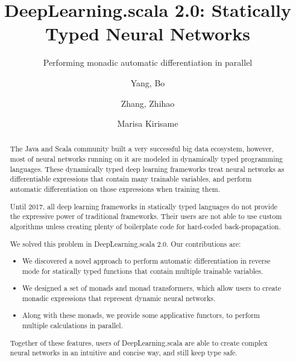 \documentclass[acmsmall,10pt,review,screen,anonymous]{acmart}
\begin{document}
\title{DeepLearning.scala 2.0: Statically Typed Neural Networks}
\subtitle{Performing monadic automatic differentiation in parallel}

\author{Yang, Bo}
\author{Zhang, Zhihao}
\author{Marisa Kirisame} 

\begin{abstract}
The Java and Scala community built a very successful big data ecosystem, however, most of neural networks running on it are modeled in dynamically typed programming languages. These dynamically typed deep learning frameworks treat neural networks as differentiable expressions that contain many \glspl{trainable variable}, and perform automatic differentiation on those expressions when training them.

Until 2017, all deep learning frameworks in statically typed languages do not
provide the expressive power of traditional frameworks. Their users are not able to use custom algorithms unless creating plenty of boilerplate code for hard-coded back-propagation.

We solved this problem in DeepLearning.scala 2.0. Our contributions are:

\begin{itemize}
  \item We discovered a novel approach to perform automatic differentiation in reverse mode for statically typed functions that contain multiple \glspl{trainable variable}.
  \item We designed a set of monads and monad transformers, which allow users to create monadic expressions that represent dynamic neural networks.
  \item Along with these monads, we provide some applicative functors, to perform multiple calculations in parallel.
\end{itemize}

Together of these features, users of DeepLearning.scala are able to create complex neural networks in an intuitive and concise way, and still keep type safe.
\end{abstract}
\end{document}
